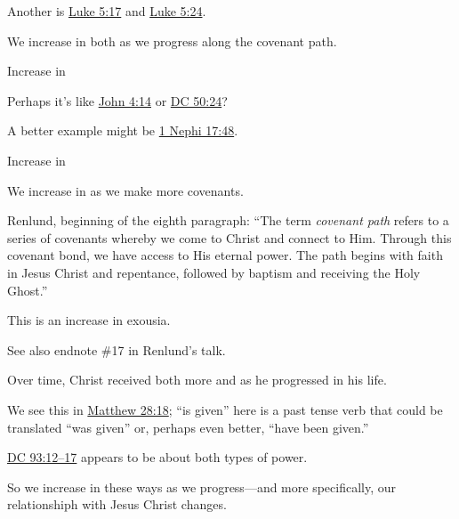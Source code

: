 \begin{compactitem}
\begin{compactitem}
\begin{compactitem}
							\item Another is \hyperref[LUKE-5-17]{Luke 5:17} and \hyperref[LUKE-5-24]{Luke 5:24}.
						\end{compactitem}
					\item We increase in both as we progress along the covenant path.
					\item Increase in 
						\begin{compactitem}
							\item Perhaps it's like \hyperref[JOHN-4-14]{John 4:14} or \hyperref[DC50-24]{DC 50:24}?
							\item A better example might be \hyperref[1NEPHI-17-48]{1 Nephi 17:48}.
						\end{compactitem}
					\item Increase in 
						\begin{compactitem}
							\item We increase in  as we make more covenants. 
						\end{compactitem}
					\item Renlund, beginning of the eighth paragraph: ``The term \textit{covenant path} refers to a series of covenants whereby we come to Christ and connect to Him. Through this covenant bond, we have access to His eternal power. The path begins with faith in Jesus Christ and repentance, followed by baptism and receiving the Holy Ghost.''
						\begin{compactitem}
							\item This is an increase in exousia.
							\item See also endnote \#17 in Renlund's talk.
						\end{compactitem}
				\end{compactitem}
			\item Over time, Christ received both more  and  as he progressed in his life.
				\begin{compactitem}
					\item We see this in \hyperref[MATTHEW-28-18]{Matthew 28:18}; ``is given'' here is a past tense verb that could be translated ``was given'' or, perhaps even better, ``have been given.''
					\item \hyperref[DC93-12]{DC 93:12--17} appears to be about both types of power.
				\end{compactitem}
			\item So we increase in these ways as we progress---and more specifically, our relationshiph with Jesus Christ changes.

\end{compactitem}

